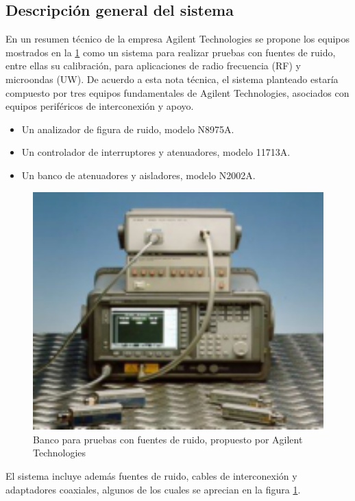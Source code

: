 \documentclass{article}
\begin{document}
	\subsection{Descripción general del sistema}
	En un resumen técnico de la empresa Agilent Technologies \cite{AGI01} se propone los equipos mostrados en la \ref{Fig:BancoPruebasFuenteRuido} como un sistema para realizar pruebas con fuentes de ruido, entre ellas su calibración, para aplicaciones de radio frecuencia
	(RF) y microondas (UW). De acuerdo a esta nota técnica, el sistema planteado estaría compuesto por tres equipos
	fundamentales de Agilent Technologies, asociados con equipos periféricos de interconexión y apoyo.
	
	\begin{itemize}
		\item Un analizador de figura de ruido, modelo N8975A.
		\item Un controlador de interruptores y atenuadores, modelo 11713A.
		\item Un banco de atenuadores y aisladores, modelo N2002A.
	\end{itemize}	

	\begin{figure}[h!]			
		\centering
		\includegraphics[width=16cm]{Imagenes/BancoPruebasFuenteRuido.png}
		\caption{Banco para pruebas con fuentes de ruido, propuesto por Agilent Technologies}
		\label{Fig:BancoPruebasFuenteRuido}
	\end{figure}

	El sistema incluye además fuentes de ruido, cables de interconexión y adaptadores coaxiales, algunos de los cuales se aprecian en la figura \ref{Fig:BancoPruebasFuenteRuido}.
	
\end{document}

